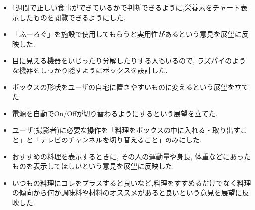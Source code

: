 \documentclass[../report]{subfiles}
\begin{document}
\begin{itemize}
    \item 1週間で正しい食事ができているかで判断できるように,栄養素をチャート表示したものを閲覧できるようにした.
    \item 「ふーろぐ」を施設で使用してもらうと実用性があるという意見を展望に反映した.
    \item 目に見える機器をいじったり分解したりする人もいるので, ラズパイのような機器をしっかり隠すようにボックスを設計した.
    \item ボックスの形状をユーザの自宅に置きやすいものに変えるという展望を立てた
    \item 電源を自動でOn/Offが切り替わるようにするという展望を立てた.
    \item ユーザ(撮影者)に必要な操作を「料理をボックスの中に入れる・取り出すこと」と「テレビのチャンネルを切り替えること」のみにした.
    \item おすすめの料理を表示するときに, その人の運動量や身長, 体重などにあったものを表示してほしいという意見を展望に反映した.
    \item いつもの料理にコレをプラスすると良いなど,料理をすすめるだけでなく料理の傾向から何か調味料や材料のオススメがあると良いという意見を展望に反映した.
\end{itemize}
\end{document}
